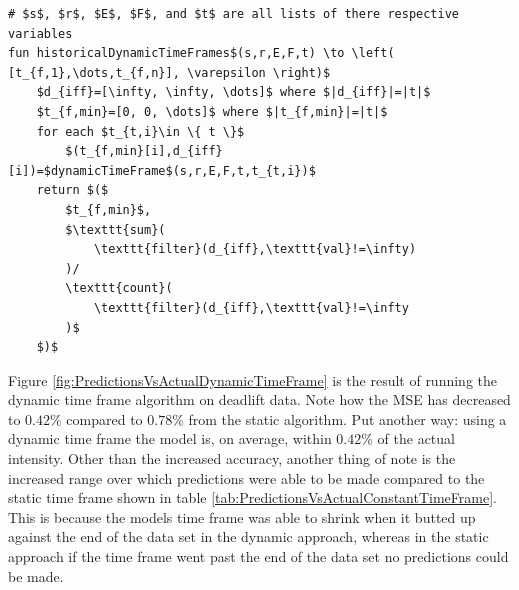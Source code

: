 \begin{minipage}{\linewidth}
\begin{lstlisting}[caption={The algorithm that describes how to find historical dynamic time frames.},label={lst:HistoricalDynamicTimeFrameFormula},mathescape=true]
# $s$, $r$, $E$, $F$, and $t$ are all lists of there respective variables
fun historicalDynamicTimeFrames$(s,r,E,F,t) \to \left( [t_{f,1},\dots,t_{f,n}], \varepsilon \right)$
    $d_{iff}=[\infty, \infty, \dots]$ where $|d_{iff}|=|t|$
    $t_{f,min}=[0, 0, \dots]$ where $|t_{f,min}|=|t|$
    for each $t_{t,i}\in \{ t \}$
        $(t_{f,min}[i],d_{iff}[i])=$dynamicTimeFrame$(s,r,E,F,t,t_{t,i})$
    return $($
        $t_{f,min}$,
        $\texttt{sum}(
            \texttt{filter}(d_{iff},\texttt{val}!=\infty)
        )/
        \texttt{count}(
            \texttt{filter}(d_{iff},\texttt{val}!=\infty
        )$
    $)$
\end{lstlisting}
\end{minipage}

Figure \ref{fig:PredictionsVsActualDynamicTimeFrame} is the result of running the dynamic time frame algorithm on deadlift data. Note how the MSE has decreased to $0.42\%$ compared to $0.78\%$ from the static algorithm. Put another way: using a dynamic time frame the model is, on average, within $0.42\%$ of the actual intensity. Other than the increased accuracy, another thing of note is the increased range over which predictions were able to be made compared to the static time frame shown in table \ref{tab:PredictionsVsActualConstantTimeFrame}. This is because the models time frame was able to shrink when it butted up against the end of the data set in the dynamic approach, whereas in the static approach if the time frame went past the end of the data set no predictions could be made.

